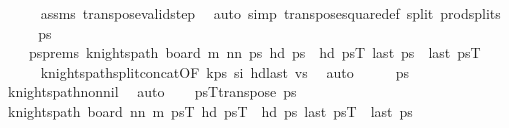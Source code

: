 \begin{isabellebody}
\ \ \ \ \isamarkupfalse%
\ assms\ transpose{\isacharunderscore}{\kern0pt}valid{\isacharunderscore}{\kern0pt}step\ \isamarkupfalse%
\ {\isacharparenleft}{\kern0pt}auto\ simp{\isacharcolon}{\kern0pt}\ transpose{\isacharunderscore}{\kern0pt}square{\isacharunderscore}{\kern0pt}def\ split{\isacharcolon}{\kern0pt}\ prod{\isachardot}{\kern0pt}splits{\isacharparenright}{\kern0pt}\isanewline
\isanewline
\ \ \isamarkupfalse%
\ \isamarkupfalse%
\ ps\ \ \isanewline
\ \ \ \ ps{\isacharunderscore}{\kern0pt}prems{\isacharcolon}{\kern0pt}\ {\isachardoublequoteopen}knights{\isacharunderscore}{\kern0pt}path\ {\isacharparenleft}{\kern0pt}board\ m\ {\isacharparenleft}{\kern0pt}nn\ ps{\isachardoublequoteclose}\ {\isachardoublequoteopen}hd\ ps\ {\isacharequal}{\kern0pt}\ hd\ {\isacharquery}{\kern0pt}psT{\isachardoublequoteclose}\ {\isachardoublequoteopen}last\ ps\ {\isacharequal}{\kern0pt}\ last\ {\isacharquery}{\kern0pt}psT{\isachardoublequoteclose}\isanewline
\ \ \ \ \isamarkupfalse%
\ knights{\isacharunderscore}{\kern0pt}path{\isacharunderscore}{\kern0pt}split{\isacharunderscore}{\kern0pt}concat{\isacharbrackleft}{\kern0pt}OF\ kps\ si\ hd{\isacharunderscore}{\kern0pt}last{}\ vs{\isacharbrackright}{\kern0pt}\ \isamarkupfalse%
\ auto\isanewline
\ \ \isamarkupfalse%
\ \isamarkupfalse%
\ {\isachardoublequoteopen}ps\ {\isasymnoteq}\ {\isacharbrackleft}{\kern0pt}{\isacharbrackright}{\kern0pt}{\isachardoublequoteclose}\ \isamarkupfalse%
\ knights{\isacharunderscore}{\kern0pt}path{\isacharunderscore}{\kern0pt}non{\isacharunderscore}{\kern0pt}nil\ \isamarkupfalse%
\ auto\isanewline
\ \ \isamarkupfalse%
\ {\isacharquery}{\kern0pt}psT{\isacharequal}{\kern0pt}{\isachardoublequoteopen}transpose\ ps{\isachardoublequoteclose}\isanewline
\ \ \isamarkupfalse%
\ {\isachardoublequoteopen}knights{\isacharunderscore}{\kern0pt}path\ {\isacharparenleft}{\kern0pt}board\ {\isacharparenleft}{\kern0pt}nn\ m{\isacharparenright}{\kern0pt}\ {\isacharquery}{\kern0pt}psT{\isachardoublequoteclose}\ {\isachardoublequoteopen}hd\ {\isacharquery}{\kern0pt}psT\ {\isacharequal}{\kern0pt}\ hd\ ps\ {\isachardoublequoteopen}last\ {\isacharquery}{\kern0pt}psT\ {\isacharequal}{\kern0pt}\ last\ ps\isanewline

\end{isabellebody}
